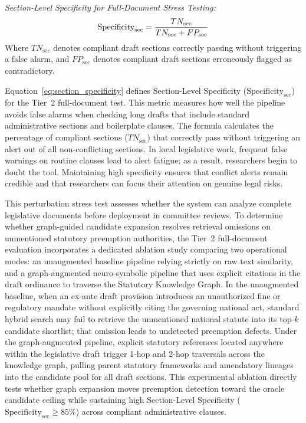     \noindent\textit{Section-Level Specificity for Full-Document Stress Testing:}
    \begin{equation}
        \text{Specificity}_{\text{sec}} = \frac{TN_{\text{sec}}}{TN_{\text{sec}} + FP_{\text{sec}}}
        \label{eq:section_specificity}
        \eqcaption{Section-Level Specificity for Full-Document Stress Testing}
    \end{equation}
    \noindent Where $TN_{\text{sec}}$ denotes compliant draft sections correctly passing without triggering a false alarm, and $FP_{\text{sec}}$ denotes compliant draft sections erroneously flagged as contradictory.

    Equation~\ref{eq:section_specificity} defines Section-Level Specificity ($\text{Specificity}_{\text{sec}}$) for the Tier~2 full-document test. This metric measures how well the pipeline avoids false alarms when checking long drafts that include standard administrative sections and boilerplate clauses. The formula calculates the percentage of compliant sections ($TN_{\text{sec}}$) that correctly pass without triggering an alert out of all non-conflicting sections. In local legislative work, frequent false warnings on routine clauses lead to alert fatigue; as a result, researchers begin to doubt the tool. Maintaining high specificity ensures that conflict alerts remain credible and that researchers can focus their attention on genuine legal risks.

    This perturbation stress test assesses whether the system can analyze complete legislative documents before deployment in committee reviews. To determine whether graph-guided candidate expansion resolves retrieval omissions on unmentioned statutory preemption authorities, the Tier~2 full-document evaluation incorporates a dedicated ablation study comparing two operational modes: an unaugmented baseline pipeline relying strictly on raw text similarity, and a graph-augmented neuro-symbolic pipeline that uses explicit citations in the draft ordinance to traverse the Statutory Knowledge Graph. In the unaugmented baseline, when an ex-ante draft provision introduces an unauthorized fine or regulatory mandate without explicitly citing the governing national act, standard hybrid search may fail to retrieve the unmentioned national statute into its top-$k$ candidate shortlist; that omission leads to undetected preemption defects. Under the graph-augmented pipeline, explicit statutory references located anywhere within the legislative draft trigger 1-hop and 2-hop traversals across the knowledge graph, pulling parent statutory frameworks and amendatory lineages into the candidate pool for all draft sections. This experimental ablation directly tests whether graph expansion moves preemption detection toward the oracle candidate ceiling while sustaining high Section-Level Specificity ($\text{Specificity}_{\text{sec}} \ge 85\%$) across compliant administrative clauses.

